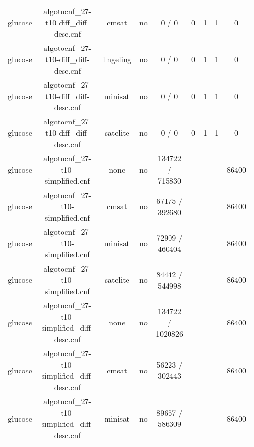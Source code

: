 \begin{appendices}
\begin{table}[p]
\begin{center}
\begin{tabular}{l|cccccccc}
  glucose                        & algotocnf\_27-t10-diff\_diff-desc.cnf & cmsat      & no    & 0 / 0      & 0         & 1         & 1          & 0 \\ %
  glucose                        & algotocnf\_27-t10-diff\_diff-desc.cnf & lingeling  & no    & 0 / 0      & 0         & 1         & 1          & 0 \\ %
  glucose                        & algotocnf\_27-t10-diff\_diff-desc.cnf & minisat    & no    & 0 / 0      & 0         & 1         & 1          & 0 \\ %
  glucose                        & algotocnf\_27-t10-diff\_diff-desc.cnf & satelite   & no    & 0 / 0      & 0         & 1         & 1          & 0 \\ %
  glucose                        & algotocnf\_27-t10-simplified.cnf & none       & no    & 134722 / 715830 &           &           &            & 86400 \\ %
  glucose                        & algotocnf\_27-t10-simplified.cnf & cmsat      & no    & 67175 / 392680 &           &           &            & 86400 \\ %
  glucose                        & algotocnf\_27-t10-simplified.cnf & minisat    & no    & 72909 / 460404 &           &           &            & 86400 \\ %
  glucose                        & algotocnf\_27-t10-simplified.cnf & satelite   & no    & 84442 / 544998 &           &           &            & 86400 \\ %
  glucose                        & algotocnf\_27-t10-simplified\_diff-desc.cnf & none       & no    & 134722 / 1020826 &           &           &            & 86400 \\ %
  glucose                        & algotocnf\_27-t10-simplified\_diff-desc.cnf & cmsat      & no    & 56223 / 302443 &           &           &            & 86400 \\ %
  glucose                        & algotocnf\_27-t10-simplified\_diff-desc.cnf & minisat    & no    & 89667 / 586309 &           &           &            & 86400 \\ %

\end{tabular}
\end{center}
\end{table}
\end{appendices}
